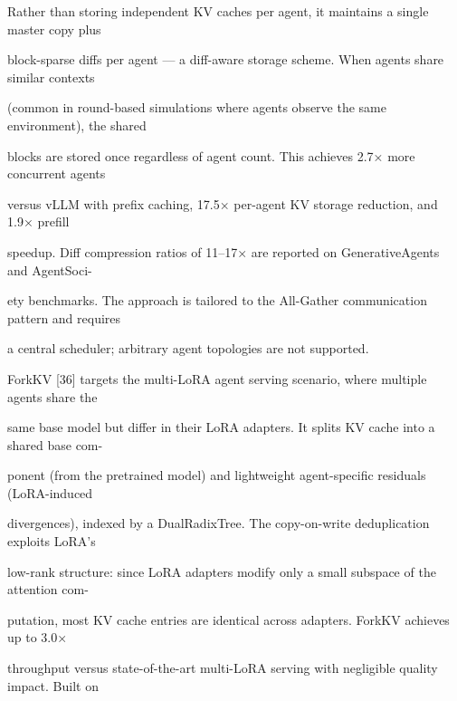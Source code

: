 \begin{flushleft}
\noindent Rather than storing independent KV caches per agent, it maintains a single master copy plus\par
\noindent block-sparse diffs per agent — a diff-aware storage scheme. When agents share similar contexts\par
\noindent (common in round-based simulations where agents observe the same environment), the shared\par
\noindent blocks are stored once regardless of agent count. This achieves 2.7× more concurrent agents\par
\noindent versus vLLM with prefix caching, 17.5× per-agent KV storage reduction, and 1.9× prefill\par
\noindent speedup. Diff compression ratios of 11–17× are reported on GenerativeAgents and AgentSoci-\par
\noindent ety benchmarks. The approach is tailored to the All-Gather communication pattern and requires\par
\noindent a central scheduler; arbitrary agent topologies are not supported.\par
\noindent  ForkKV [36] targets the multi-LoRA agent serving scenario, where multiple agents share the\par
\noindent same base model but differ in their LoRA adapters. It splits KV cache into a shared base com-\par
\noindent ponent (from the pretrained model) and lightweight agent-specific residuals (LoRA-induced\par
\noindent divergences), indexed by a DualRadixTree. The copy-on-write deduplication exploits LoRA’s\par
\noindent low-rank structure: since LoRA adapters modify only a small subspace of the attention com-\par
\noindent putation, most KV cache entries are identical across adapters. ForkKV achieves up to 3.0×\par
\noindent throughput versus state-of-the-art multi-LoRA serving with negligible quality impact. Built on\par
\end{flushleft}
